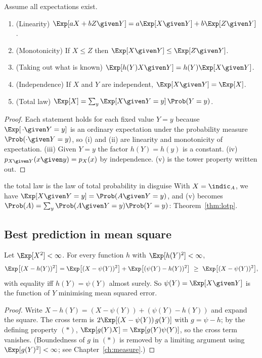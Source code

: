 \begin{theorem}\label{thm:condprops}
Assume all expectations exist.
\begin{enumerate}[label=(\roman*)]
\item (Linearity) $\Exp[aX+bZ\given Y]=a\Exp[X\given Y]+b\Exp[Z\given Y]$.
\item (Monotonicity) If $X\le Z$ then $\Exp[X\given Y]\le\Exp[Z\given Y]$.
\item (Taking out what is known) $\Exp[h(Y)X\given Y]=h(Y)\Exp[X\given Y]$.
\item (Independence) If $X$ and $Y$ are independent, $\Exp[X\given Y]=\Exp[X]$.
\item (Total law) $\Exp[X]=\sum_y\Exp[X\given Y=y]\,\Prob(Y=y)$.
\end{enumerate}
\end{theorem}
\begin{proof}
Each statement holds for each fixed value $Y=y$ because $\Exp[\,\cdot\given Y=y]$ is an
ordinary expectation under the probability measure $\Prob(\cdot\given Y=y)$, so
(i) and (ii) are linearity and monotonicity of expectation. (iii) Given $Y=y$ the
factor $h(Y)=h(y)$ is a constant. (iv) $p_{X\given Y}(x\given y)=p_X(x)$ by
independence. (v) is the tower property written out.
\end{proof}

\begin{nuance}{the total law is the law of total probability in disguise}
With $X=\indic_A$, we have $\Exp[X\given Y=y]=\Prob(A\given Y=y)$, and (v) becomes
$\Prob(A)=\sum_y\Prob(A\given Y=y)\Prob(Y=y)$: Theorem~\ref{thm:lotp}.
\end{nuance}

\subsection*{Best prediction in mean square}

\begin{theorem}\label{thm:bestpred}
Let $\Exp[X^2]<\infty$. For every function $h$ with $\Exp[h(Y)^2]<\infty$,
\[
\Exp\bigl[(X-h(Y))^2\bigr]=\Exp\bigl[(X-\psi(Y))^2\bigr]+\Exp\bigl[(\psi(Y)-h(Y))^2\bigr]
\ \ge\ \Exp\bigl[(X-\psi(Y))^2\bigr],
\]
with equality iff $h(Y)=\psi(Y)$ almost surely. So $\psi(Y)=\Exp[X\given Y]$ is the
function of $Y$ minimising mean squared error.
\end{theorem}
\begin{proof}
Write $X-h(Y)=(X-\psi(Y))+(\psi(Y)-h(Y))$ and expand the square. The cross term is
$2\Exp[(X-\psi(Y))\,g(Y)]$ with $g=\psi-h$; by the defining property $(\ast)$,
$\Exp[g(Y)X]=\Exp[g(Y)\psi(Y)]$, so the cross term vanishes. (Boundedness of $g$
in $(\ast)$ is removed by a limiting argument using $\Exp[g(Y)^2]<\infty$;
see Chapter~\ref{ch:measure}.)
\end{proof}

